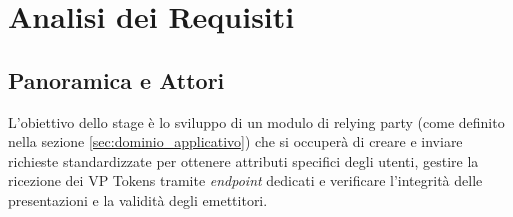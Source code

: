 \chapter{Analisi dei Requisiti}
\label{cap:analisi_requisiti}

\section{Panoramica e Attori}

L'obiettivo dello stage è lo sviluppo di un modulo di relying party (come definito nella sezione \ref{sec:dominio_applicativo}) che si occuperà di creare e inviare richieste standardizzate per ottenere attributi specifici degli utenti, gestire la ricezione dei VP Tokens tramite \textit{endpoint} dedicati e verificare l'integrità delle presentazioni e la validità degli emettitori.

